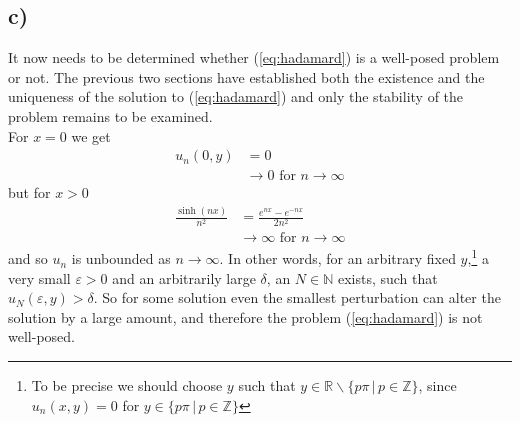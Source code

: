\documentclass[11pt]{article}
\newcommand\myreal{\mathbb{R}}
\newcommand\mynatural{\mathbb{N}}
\newcommand\myinteger{\mathbb{Z}}
\begin{document}
\subsection*{c)}
It now needs to be determined whether (\ref{eq:hadamard}) is a well-posed problem or not. The previous two sections have established both the existence and the uniqueness of the solution to (\ref{eq:hadamard}) and only the stability of the problem remains to be examined. \\
For $x=0$ we get
\begin{align*}
    u_n(0,y) &= 0 \\
    &\to 0 \text{ for } n\to\infty
\end{align*}
but for $x>0$
\begin{align*}
    \frac{\sinh(nx)}{n^2} &= \frac{e^{nx} - e^{-nx}}{2n^2} \\
    &\to \infty \text{ for } n\to\infty
\end{align*}
and so $u_n$ is unbounded as $n\to\infty$. In other words, for an arbitrary fixed $y$,\footnote{To be precise we should choose $y$ such that $y\in\myreal\backslash\{p\pi\,|\,p\in\myinteger\}$, since $u_n(x, y)=0$ for $y\in\{p\pi\,|\,p\in\myinteger\}$} a very small $\varepsilon>0$ and an arbitrarily large $\delta$, an $N\in\mynatural$ exists, such that $u_N(\varepsilon, y)>\delta$. So for some solution even the smallest perturbation can alter the solution by a large amount, and therefore the problem (\ref{eq:hadamard}) is not well-posed.
\end{document}

